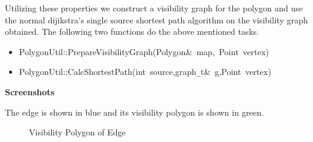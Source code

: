 \documentclass[a4paper,10pt]{article}
\begin{document}
Utilizing these properties we construct a visibility graph for the polygon and use the normal dijikstra's single source shortest path
 algorithm on the visibility graph obtained. The following two functions do the above mentioned tasks.



\begin{itemize}


\item

{
\noindent \ttfamily
\noindent \ttfamily
\noindent \ttfamily
\noindent \ttfamily
\jttstylek PolygonUtil::PrepareVisibilityGraph\jttstylei (\jttstylek Polygon\&~map,~Point~vertex\jttstylei [])\\

}


\item

{
\noindent \ttfamily
\jttstylek PolygonUtil::CalcShortestPath\jttstylei (\jttstylej int~\jttstylek source,graph\verb#_#t\&~g,Point~vertex\jttstylei [])\\
\noindent \ttfamily
}

\end{itemize}

{\bf Screenshots}

The edge is shown in blue and its visibility polygon is shown in green.

\begin{figure}[h]
\begin{center}
\caption{\label{fig:Visibility Polygon of Edge}Visibility Polygon of Edge}
\end{center}
\end{figure}
\end{document}
